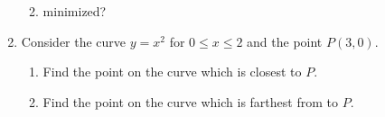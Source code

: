 \documentclass[12pt]{article}
\newif\ifans
\begin{document}
\begin{enumerate}
\begin{enumerate}
\ifans{\fbox{0 inches; i.e., all of the wire should be used to make the square.}} \fi

\item minimized?

\ifans{\fbox{$\frac{216}{4\sqrt{3}+9}\approx13.56$ inches}} \fi

\end{enumerate}

\item Consider the curve $y=x^2$ for $0\leq x \leq 2$ and the point $P(3,0)$.

\begin{enumerate}

\item Find the point on the curve which is closest to $P$.

\ifans{\fbox{$(1,1)$ which is a distance of $\sqrt{5}$ from $P$.}} \fi

\item Find the point on the curve which is farthest from to $P$.

\ifans{\fbox{$(2,4)$ which is a distance of $\sqrt{17}$ from $P$}} \fi

\end{enumerate}

\end{enumerate}
\end{document}
